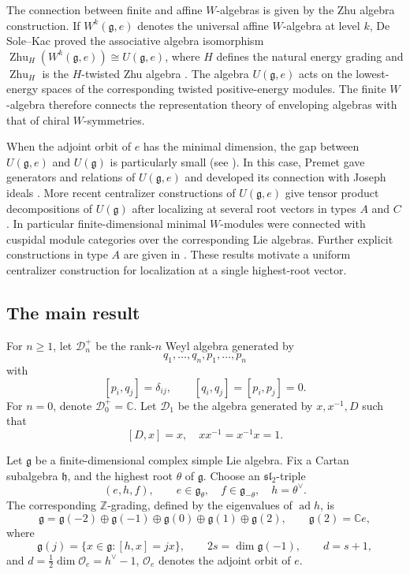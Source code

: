 \documentclass[12pt,a4paper]{amsart}
\numberwithin{equation}{section}
\theoremstyle{definition}
\theoremstyle{remark}
\newcommand{\C}{\mathbb{C}}
\newcommand{\g}{\mathfrak g}
\newcommand{\h}{\mathfrak h}
\newcommand{\D}{\mathcal D}
\newcommand{\Z}{\mathbb Z}
\newcommand{\ad}{\operatorname{ad}}
\newcommand{\Oe}{\mathcal O_e}
\begin{document}
The connection between finite and affine \(W\)-algebras is given
by the Zhu algebra construction. If \(W^k(\g,e)\) denotes the universal
affine \(W\)-algebra at level \(k\),
De Sole--Kac proved the associative algebra isomorphism
\(
 \operatorname{Zhu}_{H}\!\left(W^k(\g,e)\right)
 \cong U(\g,e)\),
where \(H\) defines the natural energy grading and
\(\operatorname{Zhu}_{H}\) is the \(H\)-twisted Zhu algebra
\cite[Theorem~5.10]{DeSoleKac}.
The algebra $U(\g,e)$ acts on the lowest-energy spaces of the
corresponding twisted positive-energy modules.
The finite \(W\)-algebra therefore connects the representation theory
of enveloping algebras with that of chiral \(W\)-symmetries.

 When the adjoint orbit of $e$  has the minimal dimension,  the gap between $U(\g, e)$   and $U(\g)$ is particularly small (see \cite{Pr2,Pe}). In this case,  Premet gave generators and relations of $U(\g, e)$ and developed its connection with
Joseph ideals \cite{Pr2}. More recent centralizer constructions of $U(\g,e)$ give tensor product decompositions of $U(\g)$ after
localizing at several root vectors in types \(A\) and \(C\)
\cite{LL,LiuMingjieLi2024}.
In particular finite-dimensional minimal \(W\)-modules were connected with
cuspidal module categories over the corresponding Lie algebras.
Further explicit constructions in type \(A\) are given in
\cite{LiuMingjieLi2025}.
These results motivate a uniform centralizer construction for
localization at a single highest-root vector.


\subsection{The main result}

For $n\geq 1$, let $\D_n^+$ be the rank-$n$ Weyl algebra generated by
$$q_1,\ldots,q_n,p_1,\ldots,p_n$$ with
\[
[p_i,q_j]=\delta_{ij},\qquad
[q_i,q_j]=[p_i,p_j]=0.
\]
For $n=0$, denote  \(\D^+_0=\C\).  Let $\D_1$ be the algebra generated by $x, x^{-1}, D$ such that
$$[D,x]=x,\quad xx^{-1}=x^{-1}x=1.$$


Let \(\g\) be a finite-dimensional complex simple Lie algebra.
Fix a Cartan subalgebra $\h$, and the highest root
$\theta$ of $\g$.  Choose an $\mathfrak{sl}_2$-triple
\[
(e,h,f),\qquad e\in\g_\theta,\quad f\in\g_{-\theta},\quad h=\theta^\vee.
\]
The corresponding $\Z$-grading, defined by the eigenvalues of $\ad h$,
is
\[
\g=\g(-2)\oplus\g(-1)\oplus\g(0)\oplus\g(1)\oplus\g(2),
\qquad \g(2)=\C e,
\]
where
\[
 \g(j)=\{x\in\g:[h,x]=jx\},\qquad
 2s=\dim\g(-1),\qquad d=s+1,
\]
and $ d=\frac12\dim\Oe=h^\vee-1$, \(\Oe\) denotes the adjoint orbit of \(e\).
\end{document}
